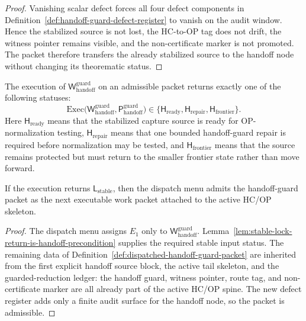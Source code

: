 \begin{proof}
Vanishing scalar defect forces all four defect components in Definition~\ref{def:handoff-guard-defect-register} to vanish on the audit window. Hence the stabilized source is not lost, the HC-to-OP tag does not drift, the witness pointer remains visible, and the non-certificate marker is not promoted. The packet therefore transfers the already stabilized source to the handoff node without changing its theorematic status.
\end{proof}

\begin{definition}
\label{def:r17-handoff-guard-return}
The execution of \(\mathsf W_{\mathrm{handoff}}^{\mathrm{guard}}\) on an admissible packet returns exactly one of the following statuses:
\[
\mathrm{Exec}\bigl(\mathsf W_{\mathrm{handoff}}^{\mathrm{guard}},
 \mathsf P_{\mathrm{handoff}}^{\mathrm{guard}}\bigr)
\in
\{\mathsf H_{\mathrm{ready}},\mathsf H_{\mathrm{repair}},\mathsf H_{\mathrm{frontier}}\}.
\]
Here \(\mathsf H_{\mathrm{ready}}\) means that the stabilized capture source is ready for OP-normalization testing, \(\mathsf H_{\mathrm{repair}}\) means that one bounded handoff-guard repair is required before normalization may be tested, and \(\mathsf H_{\mathrm{frontier}}\) means that the source remains protected but must return to the smaller frontier state rather than move forward.
\end{definition}

\begin{proposition}
\label{prop:first-dispatched-handoff-guard-packet-admissible}
If the execution returns \(\mathsf L_{\mathrm{stable}}\), then the dispatch menu admits the handoff-guard packet as the next executable work packet attached to the active HC/OP skeleton.
\end{proposition}

\begin{proof}
The dispatch menu assigns \(E_1\) only to \(\mathsf W_{\mathrm{handoff}}^{\mathrm{guard}}\). Lemma~\ref{lem:stable-lock-return-is-handoff-precondition} supplies the required stable input status. The remaining data of Definition~\ref{def:dispatched-handoff-guard-packet} are inherited from the first explicit handoff source block, the active tail skeleton, and the guarded-reduction ledger: the handoff guard, witness pointer, route tag, and non-certificate marker are all already part of the active HC/OP spine. The new defect register adds only a finite audit surface for the handoff node, so the packet is admissible.
\end{proof}

